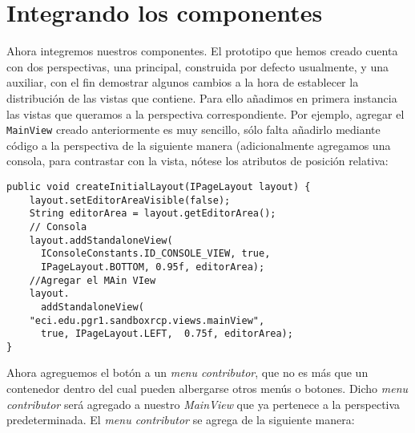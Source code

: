 \documentclass[journal]{IEEEtran}
\begin{document}
\section{Integrando los componentes}
Ahora integremos nuestros componentes. El prototipo que hemos creado cuenta con dos perspectivas, una principal, construida por defecto usualmente, y una auxiliar, 
con el fin demostrar algunos cambios a la hora de establecer la distribución de las vistas que contiene.
Para ello añadimos en primera instancia las vistas que queramos a la perspectiva correspondiente. Por ejemplo, agregar el \texttt{MainView} creado anteriormente es muy sencillo, 
sólo falta añadirlo mediante código a la perspectiva de la siguiente manera (adicionalmente agregamos una consola, para contrastar con la vista, nótese los atributos 
de posición relativa: 

\lstset{language=Java, tabsize=4}
\begin{scriptsize}\ttfamily\begin{lstlisting}
public void createInitialLayout(IPageLayout layout) {
    layout.setEditorAreaVisible(false);
    String editorArea = layout.getEditorArea();  
    // Consola
    layout.addStandaloneView(
      IConsoleConstants.ID_CONSOLE_VIEW, true, 
      IPageLayout.BOTTOM, 0.95f, editorArea);
    //Agregar el MAin VIew
    layout.
      addStandaloneView(
	"eci.edu.pgr1.sandboxrcp.views.mainView", 
      true, IPageLayout.LEFT,  0.75f, editorArea);
}

\end{lstlisting}\end{scriptsize}
Ahora agreguemos el botón a un \textit{menu contributor}, que no es más que un contenedor dentro del cual pueden albergarse otros menús o botones. Dicho \textit{menu contributor} será 
agregado a nuestro \textit{MainView} que ya pertenece a la perspectiva predeterminada.
El \textit{menu contributor} se agrega de la siguiente manera:
\end{document}
